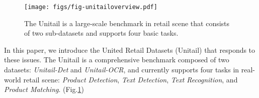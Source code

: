 \documentclass[runningheads]{llncs}
\begin{document}


\begin{figure}[t]
    \centering
    \texttt{[image: figs/fig-unitailoverview.pdf]}
    \caption{The Unitail is a large-scale benchmark in retail scene that consists of two sub-datasets and supports four basic tasks.}
    \label{fig:overview}
\end{figure}

In this paper, we introduce the United Retail Datasets (Unitail) that responds to these issues. The Unitail is a comprehensive benchmark composed of two datasets: \textit{Unitail-Det} and \textit{Unitail-OCR}, and currently supports four tasks in real-world retail scene: \textit{Product Detection}, \textit{Text Detection}, \textit{Text Recognition}, and \textit{Product Matching}. (Fig.\ref{fig:overview})
\end{document}
